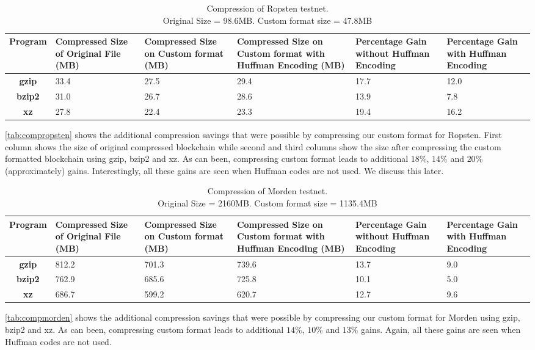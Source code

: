 \begin{table}[H]
\centering
\captionsetup{justification=centering}
\begin{tabular}{ >{\bfseries}c| p{2cm} | p{2cm} |p{2cm} | p{1.5cm} | p{1.5cm} }
	Program & {Compressed Size of Original File (MB)} & {Compressed Size on Custom format (MB)} & {Compressed Size on Custom format with Huffman Encoding (MB)}& Percentage Gain without Huffman Encoding & Percentage Gain with Huffman Encoding\\
  \hline
  gzip  & 33.4 & 27.5 & 29.4 & 17.7 & 12.0 \\
  bzip2 & 31.0 & 26.7 & 28.6 & 13.9 & 7.8  \\
  xz   & 27.8 & 22.4 &  23.3 & 19.4 & 16.2 \\
\end{tabular}
\caption{Compression of Ropsten testnet. \\ Original Size = 98.6MB. Custom format size = 47.8MB}
\label{tab:compropsten}
\end{table}
\autoref{tab:compropsten} 
shows the additional compression savings that were possible by compressing 
our custom format for Ropsten.
First column shows the size of original compressed blockchain 
while
second and third columns show the size after compressing the custom formatted blockchain using gzip, bzip2 and xz. 
As can been, compressing custom format leads to additional $18\%$, $14\%$ and $20\%$ (approximately) gains. Interestingly, all these gains are seen when
Huffman codes are not used. We discuss this later.



\begin{table}[H]
\centering
\captionsetup{justification=centering}
\begin{tabular}{ >{\bfseries}c| p{2cm} | p{2cm} | p{2cm} | p{1.5cm} | p{1.5cm} }
	Program & {Compressed Size of Original File (MB)} & {Compressed Size on Custom format (MB)} & {Compressed Size on Custom format with Huffman Encoding (MB)} & Percentage Gain without Huffman Encoding & Percentage Gain with Huffman Encoding \\
  \hline
  gzip  & 812.2 & 701.3 & 739.6 & 13.7 & 9.0 \\
  bzip2 & 762.9 & 685.6 & 725.8 & 10.1 & 5.0 \\
  xz   & 686.7 & 599.2 &  620.7 & 12.7 & 9.6 \\
\end{tabular}
\caption{Compression of Morden testnet. \\Original Size = 2160MB. Custom format size = 1135.4MB}
\label{tab:compmorden}
\end{table}
\autoref{tab:compmorden} 
shows the additional compression savings that were possible by compressing 
our custom format for Morden using gzip, bzip2 and xz.
As can been, compressing custom format leads to additional $14\%$, $10\%$ and $13\%$  gains. Again, all these gains are seen when Huffman codes are not used. 

